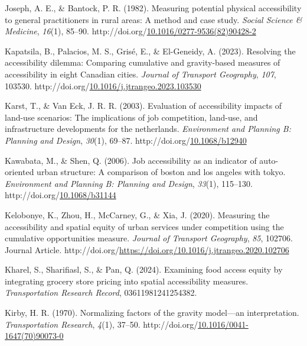 \documentclass[
11pt, %
oneside, %
english, %
singlespacing, %
]{macthesis} %
\newlength{\cslhangindent}
\newenvironment{CSLReferences}[2] %
{\begin{list}{}{%
	\setlength{\itemindent}{0pt}
	\setlength{\leftmargin}{0pt}
	\setlength{\parsep}{0pt}
	\ifodd #1
	\setlength{\leftmargin}{\cslhangindent}
	\setlength{\itemindent}{-1\cslhangindent}
	\fi
	\setlength{\itemsep}{#2\baselineskip}}}
{\end{list}}
\begin{document}
\begin{CSLReferences}{1}{0}
Joseph, A. E., \& Bantock, P. R. (1982). Measuring potential physical accessibility to general practitioners in rural areas: A method and case study. \emph{Social Science \& Medicine}, \emph{16}(1), 85--90. http://doi.org/\href{https://doi.org/10.1016/0277-9536(82)90428-2}{10.1016/0277-9536(82)90428-2}

Kapatsila, B., Palacios, M. S., Grisé, E., \& El-Geneidy, A. (2023). Resolving the accessibility dilemma: {Comparing} cumulative and gravity-based measures of accessibility in eight {Canadian} cities. \emph{Journal of Transport Geography}, \emph{107}, 103530. http://doi.org/\href{https://doi.org/10.1016/j.jtrangeo.2023.103530}{10.1016/j.jtrangeo.2023.103530}

Karst, T., \& Van Eck, J. R. R. (2003). Evaluation of accessibility impacts of land-use scenarios: The implications of job competition, land-use, and infrastructure developments for the netherlands. \emph{Environment and Planning B: Planning and Design}, \emph{30}(1), 69--87. http://doi.org/\href{https://doi.org/10.1068/b12940}{10.1068/b12940}

Kawabata, M., \& Shen, Q. (2006). Job accessibility as an indicator of auto-oriented urban structure: A comparison of boston and los angeles with tokyo. \emph{Environment and Planning B: Planning and Design}, \emph{33}(1), 115--130. http://doi.org/\href{https://doi.org/10.1068/b31144}{10.1068/b31144}

Kelobonye, K., Zhou, H., McCarney, G., \& Xia, J. (2020). Measuring the accessibility and spatial equity of urban services under competition using the cumulative opportunities measure. \emph{Journal of Transport Geography}, \emph{85}, 102706. Journal Article. http://doi.org/\url{https://doi.org/10.1016/j.jtrangeo.2020.102706}

Kharel, S., Sharifiasl, S., \& Pan, Q. (2024). Examining food access equity by integrating grocery store pricing into spatial accessibility measures. \emph{Transportation Research Record}, 03611981241254382.

Kirby, H. R. (1970). Normalizing factors of the gravity model---an interpretation. \emph{Transportation Research}, \emph{4}(1), 37--50. http://doi.org/\href{https://doi.org/10.1016/0041-1647(70)90073-0}{10.1016/0041-1647(70)90073-0}


\end{CSLReferences}
\end{document}
